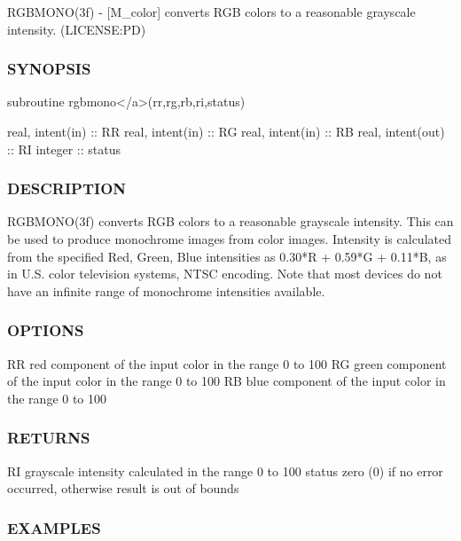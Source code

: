 R\+G\+B\+M\+O\+N\+O(3f) -\/ \mbox{[}M\+\_\+color\mbox{]} converts R\+GB colors to a reasonable grayscale intensity. (L\+I\+C\+E\+N\+SE\+:PD) 

\subsubsection*{S\+Y\+N\+O\+P\+S\+IS}

\begin{DoxyVerb}subroutine rgbmono</a>(rr,rg,rb,ri,status)

 real, intent(in)  :: RR
 real, intent(in)  :: RG
 real, intent(in)  :: RB
 real, intent(out) :: RI
 integer           :: status
\end{DoxyVerb}


\subsubsection*{D\+E\+S\+C\+R\+I\+P\+T\+I\+ON}

\begin{DoxyVerb}RGBMONO(3f) converts RGB colors to a reasonable grayscale intensity.
This can be used to produce monochrome images from color images.
Intensity is calculated from the specified Red, Green, Blue intensities
as 0.30*R + 0.59*G + 0.11*B, as in U.S. color television systems,
NTSC encoding. Note that most devices do not have an infinite range
of monochrome intensities available.
\end{DoxyVerb}
 \subsubsection*{O\+P\+T\+I\+O\+NS}

\begin{DoxyVerb} RR      red component of the input color in the range 0 to 100
 RG      green component of the input color in the range 0 to 100
 RB      blue component of the input color in the range 0 to 100
\end{DoxyVerb}
 \subsubsection*{R\+E\+T\+U\+R\+NS}

RI grayscale intensity calculated in the range 0 to 100 status zero (0) if no error occurred, otherwise result is out of bounds \subsubsection*{E\+X\+A\+M\+P\+L\+ES}

